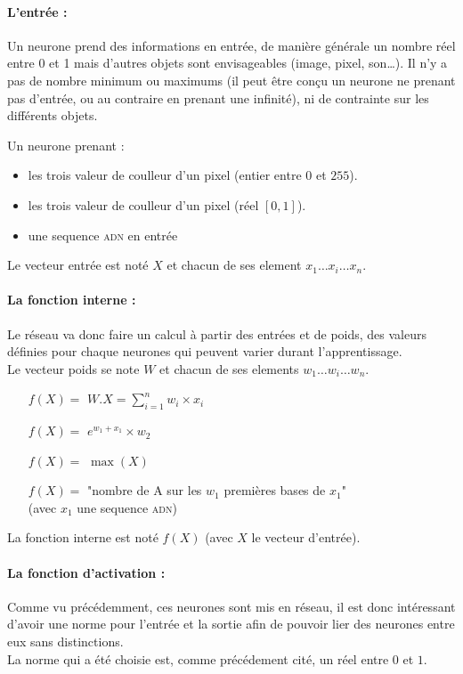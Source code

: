 \paragraph{L'entrée :}
Un neurone prend des informations en entrée, de manière générale un nombre réel entre 0 et 1
mais d'autres objets sont envisageables (image, pixel, son\ldots).
Il n'y a pas de nombre minimum ou maximums
(il peut être conçu un neurone ne prenant pas d'entrée, ou au contraire en prenant une infinité),
ni de contrainte sur les différents objets.
\exemle
{
Un neurone prenant :
\begin{itemize}
    \item les trois valeur de coulleur d'un pixel (entier entre $0$ et $255$).
    \item les trois valeur de coulleur d'un pixel (réel $[0, 1]$).
    \item une sequence \textsc{adn} en entrée

\end{itemize}
}
Le vecteur entrée est noté $X$ et chacun de ses element $x_1 \ldots x_i \ldots x_n$.

\paragraph{La fonction interne :}
Le réseau va donc faire un calcul à partir des entrées et de poids,
des valeurs définies pour chaque neurones qui peuvent varier durant l'apprentissage. \\
Le vecteur poids se note $W$ et chacun de ses elements $w_1 \ldots w_i \ldots w_n$.

\exemle
{
\begin{itemize}
    \item[$f(X) =$] $W.X = \sum_{i=1}^{n} w_i \times x_i $
    \item[$f(X) =$] $e^{w_1 + x_1} \times w_2$
    \item[$f(X) =$] $\max(X)$
    \item[$f(X) =$] "nombre de A sur les $w_1$ premières bases de $x_1$" \\
            (avec $x_1$ une sequence \textsc{adn})
\end{itemize}
}
La fonction interne est noté $f(X)$ (avec $X$ le vecteur d'entrée).

\paragraph{La fonction d'activation :}
Comme vu précédemment, ces neurones sont mis en réseau,
il est donc intéressant d'avoir une norme pour l'entrée et la sortie
afin de pouvoir lier des neurones entre eux sans distinctions. \\
La norme qui a été choisie est, comme précédement cité, un réel entre $0$ et $1$.


